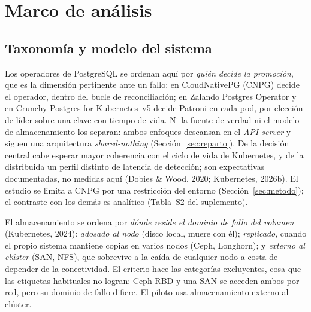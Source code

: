 \documentclass[12pt,twocolumn,letterpaper]{article}
\begin{document}
\section{Marco de análisis}\label{sec:marco}
\subsection{Taxonomía y modelo del sistema}\label{sec:taxo}
Los operadores de PostgreSQL se ordenan aquí por \emph{quién decide la promoción}, que es la dimensión pertinente ante un fallo: en CloudNativePG (CNPG) decide el operador, dentro del bucle de reconciliación; en Zalando Postgres Operator y en Crunchy Postgres for Kubernetes~v5 decide Patroni en cada pod, por elección de líder sobre una clave con tiempo de vida. Ni la fuente de verdad ni el modelo de almacenamiento los separan: ambos enfoques descansan en el \textit{API server} y siguen una arquitectura \textit{shared-nothing} (Sección~\ref{sec:reparto}). De la decisión central cabe esperar mayor coherencia con el ciclo de vida de Kubernetes, y de la distribuida un perfil distinto de latencia de detección; son expectativas documentadas, no medidas aquí (Dobies \& Wood, 2020; Kubernetes, 2026b). El estudio se limita a CNPG por una restricción del entorno (Sección~\ref{sec:metodo}); el contraste con los demás es analítico (Tabla~S2 del suplemento).

El almacenamiento se ordena por \emph{dónde reside el dominio de fallo del volumen} (Kubernetes, 2024): \textit{adosado al nodo} (disco local, muere con él); \textit{replicado}, cuando el propio sistema mantiene copias en varios nodos (Ceph, Longhorn); y \textit{externo al clúster} (SAN, NFS), que sobrevive a la caída de cualquier nodo a costa de depender de la conectividad. El criterio hace las categorías excluyentes, cosa que las etiquetas habituales no logran: Ceph RBD y una SAN se acceden ambos por red, pero su dominio de fallo difiere. El piloto usa almacenamiento externo al clúster.
\end{document}
